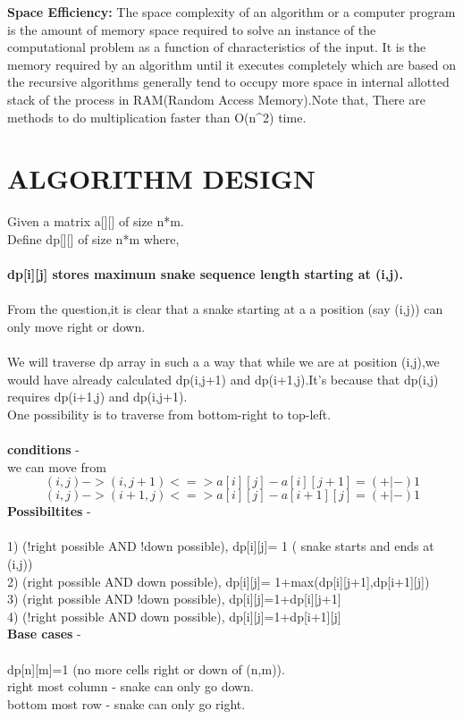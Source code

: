 \documentclass[10pt]{article}
\begin{document}
\textbf{Space Efficiency:} The space complexity of an algorithm or a computer program is the amount of memory space required to solve an instance of the computational problem as a function of characteristics of the input. It is the memory required by an algorithm until it executes completely which are based on the recursive algorithms generally tend to occupy more space in internal allotted stack of the process in RAM(Random Access Memory).Note that, There are methods to do multiplication faster than O(n^2) time.
\fi

\section*{ALGORITHM DESIGN}
Given a  matrix  a[][] of size n*m.\\
Define dp[][] of size n*m where,\\\\
   \textbf{ dp[i][j] stores maximum snake sequence length starting at (i,j).}\\\\
    From the question,it is clear that a snake starting at a a position (say (i,j)) can only move right or down.\\\\
  We will traverse dp array in such a a way that  while we are at position (i,j),we would have already calculated dp(i,j+1) and dp(i+1,j).It's because that dp(i,j) requires dp(i+1,j) and  dp(i,j+1).\\
 One possibility is to  traverse from bottom-right to top-left.\\\\
\textbf{ conditions} - \\
 we can move from \\
       \[ (i,j)  -> (i,j+1) <=>  a[i][j]-a[i][j+1]=(+|-)1\]
      \[(i,j)  -> (i+1,j)  <=> a[i][j]-a[i+1][j]=(+|-)1\]
   \textbf{Possibiltites }-\\\\
 1)  (!right possible AND !down possible), dp[i][j]= 1  ( snake starts and ends at (i,j))\\
 2) (right possible AND down possible),   dp[i][j]= 1+max(dp[i][j+1],dp[i+1][j])\\
 3) (right possible AND  !down possible),  dp[i][j]=1+dp[i][j+1]\\
 4) (!right possible AND  down possible),  dp[i][j]=1+dp[i+1][j]\\

   \textbf{Base cases} -\\\\
   dp[n][m]=1  (no more cells right or down of (n,m)).\\
    right most column  -  snake can only go down.\\
    bottom most row  -  snake can only go right.\\
\end{document}
